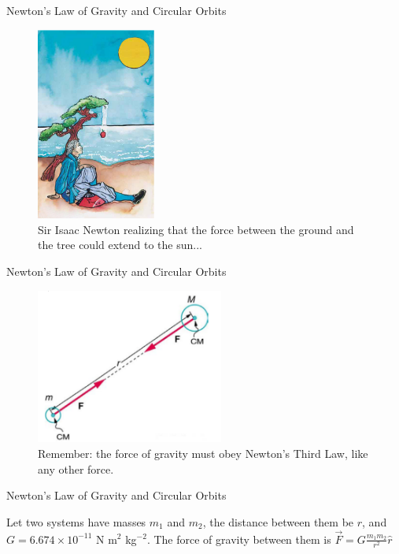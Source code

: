 \documentclass{beamer}
\begin{document}
\begin{frame}{Newton's Law of Gravity and Circular Orbits}
\begin{figure}
\centering
\includegraphics[width=0.35\textwidth]{figures/newton.png}
\caption{\label{fig:apple} Sir Isaac Newton realizing that the force between the ground and the tree could extend to the sun...}
\end{figure}
\end{frame}

\begin{frame}{Newton's Law of Gravity and Circular Orbits}
\begin{figure}
\centering
\includegraphics[width=0.55\textwidth]{figures/third.png}
\caption{\label{fig:third} Remember: the force of gravity must obey Newton's Third Law, like any other force.}
\end{figure}
\end{frame}

\begin{frame}{Newton's Law of Gravity and Circular Orbits}
\begin{tcolorbox}[colback=white,colframe=red!40!blue,title=Newton's Law of Gravitation]
\alert{Let two systems have masses $m_1$ and $m_2$, the distance between them be $r$, and $G = 6.674\times 10^{-11}$ N m$^2$ kg$^{-2}$.  The force of gravity between them is}\vspace{0.2cm}
\alert{$\vec{F} = G\frac{m_1 m_2}{r^2}\hat{r}$}
\end{tcolorbox}
\end{frame}
\end{document}
